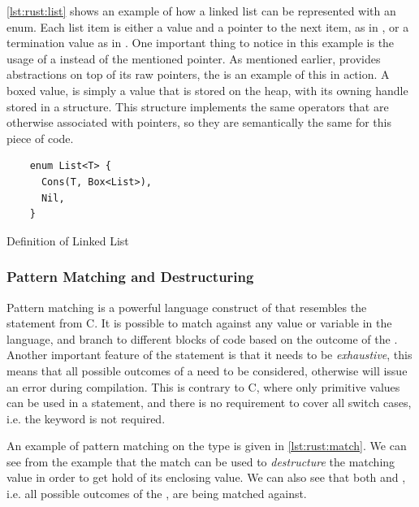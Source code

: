 \autoref{lst:rust:list} shows an example of how a linked list can be represented with an enum.
Each list item is either a value and a pointer to the next item, as in , or a termination value as in .
One important thing to notice in this example is the usage of a  instead of the mentioned pointer.
As mentioned earlier, {\rust} provides abstractions on top of its raw pointers, the  is an example of this in action.
A boxed value, is simply a value that is stored on the heap, with its owning handle stored in a  structure.
This structure implements the same operators that are otherwise associated with pointers, so they are semantically the same for this piece of code.

\begin{listing}[H]
  \begin{verbatim}
    enum List<T> {
      Cons(T, Box<List>),
      Nil,
    }
  \end{verbatim}
  \caption{Definition of Linked List}
  \label{lst:rust:list}
\end{listing}

\subsubsection{Pattern Matching and Destructuring}
\label{sub:pattern_matching}

Pattern matching is a powerful language construct of {\rust} that resembles the  statement from C.
It is possible to match against any value or variable in the language, and branch to different blocks of code based on the outcome of the .
Another important feature of the  statement is that it needs to be \emph{exhaustive}, this means that all possible outcomes of a  need to be considered, otherwise {\rust} will issue an error during compilation.
This is contrary to C, where only primitive values can be used in a  statement, and there is no requirement to cover all switch cases, i.e. the  keyword is not required.

An example of pattern matching on the  type is given in \autoref{lst:rust:match}.
We can see from the example that the match can be used to \emph{destructure} the matching value in order to get hold of its enclosing value.
We can also see that both  and , i.e. all possible outcomes of the , are being matched against.

